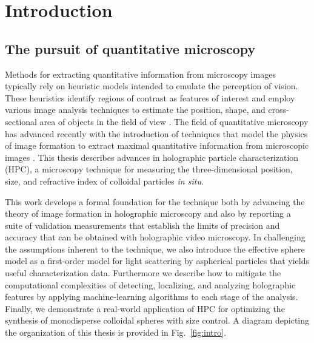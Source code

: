 \chapter{Introduction}
\label{ch:intro}






\section{The pursuit of quantitative microscopy}

Methods for extracting quantitative information from microscopy
images typically rely on heuristic models intended to emulate
the perception of vision.
These heuristics identify regions of contrast as features
of interest and employ various image analysis techniques to estimate
the position, shape, and cross-sectional area of objects in the
field of view \cite{jahne97,gonzalez06,castleman96,pratt16,jain89}.
The field of quantitative microscopy has advanced recently with the
introduction of techniques that model the physics of image formation
to extract maximal quantitative information
from microscopic images \cite{lee07,bierbaum2017}.
This thesis describes advances in holographic particle characterization (HPC),
a microscopy technique for measuring
the three-dimensional position, size, and refractive index of
colloidal particles \emph{in situ}.

This work develops a formal foundation for the technique both by
advancing the theory of image formation in holographic microscopy
and also by reporting a suite of validation measurements
that establish the limits of precision and accuracy that can be
obtained with holographic video microscopy. In challenging
the assumptions inherent to the technique, we also introduce the
effective sphere model as a first-order model for
light scattering by aspherical particles that yields useful
characterization data.
Furthermore we describe how to mitigate the computational complexities
of detecting, localizing, and analyzing holographic features by
applying machine-learning algorithms to each stage of the analysis.
Finally, we demonstrate a real-world application
of HPC for optimizing the synthesis of monodisperse
colloidal spheres with size control. A diagram depicting the organization
of this thesis is provided in Fig.~\ref{fig:intro}.



